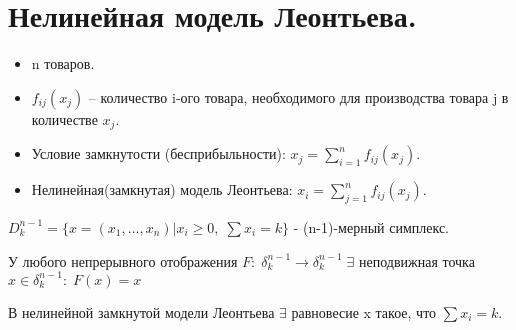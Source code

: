 \chapter{Нелинейная модель Леонтьева.}\label{cha:10}

\begin{itemize}
	\item n товаров.
	\item $f_{ij}(x_j)$ -- количество i-ого товара, необходимого для производства товара j в количестве $x_j$.
	\item Условие замкнутости (бесприбыльности): $x_j = \sum\limits_{i = 1}^nf_{ij}(x_j)$.
	\item  Нелинейная(замкнутая) модель Леонтьева: $x_i = \sum\limits_{j = 1}^nf_{ij}(x_j)$.
\end{itemize}

\begin{sign}
	$D_k^{n - 1} = \{x = (x_1, \ldots, x_n) | x_i \geq 0, \; \sum x_i = k\}$ - (n-1)-мерный симплекс.
\end{sign}

\begin{theorem}
	У любого непрерывного отображения $F: \; \delta_k^{n-1} \rightarrow \delta_k^{n-1} \; \exists$ неподвижная точка $x \in \delta_k^{n-1}: \; F(x) = x$
\end{theorem}

\begin{theorem}
	В нелинейной замкнутой модели Леонтьева $\exists$ равновесие x такое, что $\sum x_i = k$.
\end{theorem}